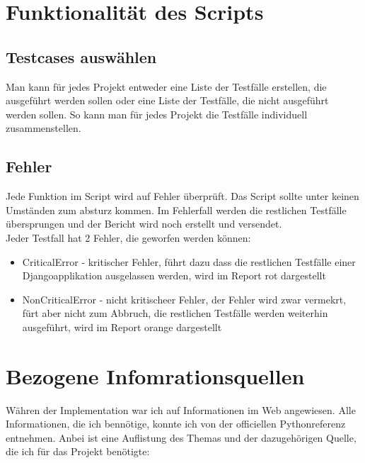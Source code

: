 \section{Funktionalität des Scripts}
\subsection{Testcases auswählen}
Man kann für jedes Projekt entweder eine Liste der Testfälle erstellen, die ausgeführt werden sollen oder eine Liste der Testfälle, die nicht ausgeführt werden sollen.
So kann man für jedes Projekt die Testfälle individuell zusammenstellen.

\subsection{Fehler}
Jede Funktion im Script wird auf Fehler überprüft. Das Script sollte unter keinen Umständen zum absturz kommen. 
Im Fehlerfall werden die restlichen Testfälle übersprungen und der Bericht wird noch erstellt und versendet. \\
Jeder Testfall hat 2 Fehler, die geworfen werden können: 
\begin{itemize}
    \item CriticalError - kritischer Fehler, führt dazu dass die restlichen Testfälle einer Djangoapplikation ausgelassen werden, wird im Report rot dargestellt 
    \item NonCriticalError - nicht kritischeer Fehler, der Fehler wird zwar vermekrt, fürt aber nicht zum Abbruch, die restlichen Testfälle werden weiterhin ausgeführt, wird im Report orange dargestellt
\end{itemize}

\section{Bezogene Infomrationsquellen}
Währen der Implementation war ich auf Informationen im Web angewiesen. Alle Informationen, die ich bennötige, konnte ich von der officiellen Pythonreferenz entnehmen. 
Anbei ist eine Auflistung des Themas und der dazugehörigen Quelle, die ich für das Projekt benötigte:


